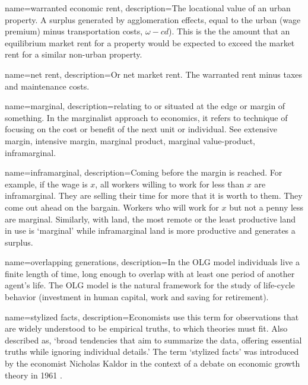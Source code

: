 {
name=warranted economic rent,
description={The locational value of an urban property. A surplus generated by \glspl{agglomeration effect}, equal to the urban (wage premium) minus transportation costs, $\omega-{c} d$). This is the the amount that an equilibrium market rent for a property would be expected to exceed the market rent for a similar non-urban property.}
}

{
name=net rent,
description={Or net market rent. The \gls{warranted rent} minus taxes and maintenance costs.}
}



{
name=marginal,
description={relating to or situated at the edge or margin of something. In the marginalist approach to economics, it  refers to technique of focusing on the cost or benefit of the next unit or individual. See \gls{extensive margin}, \gls{intensive margin}, \gls{marginal product}, \gls{marginal value-product}, \gls{inframarginal}.}
}

{
name=inframarginal,
description={Coming before the margin is reached. For example, if the wage is $x$, all workers willing to work for less than $x$ are inframarginal. They are selling their time for more that it is worth to them. They come out ahead on the bargain. Workers who will work for $x$ but not a penny less are marginal. Similarly, with land, the most remote or the least productive land in use is `marginal' while  inframarginal land is more productive and generates a \gls{surplus}.}
}

{
name=overlapping generations,
description={In the \gls{OLG} model individuals live a finite length of time, long enough to overlap with at least one period of another agent's life. The OLG model is the natural framework for the study of life-cycle behavior (investment in human capital, work and saving for retirement).}
}

{
name=stylized facts,
description={Economists use this term for observations that are widely understood to be empirical truths, to which theories must fit.  Also described as, `broad tendencies that aim to summarize the data, offering essential truths while ignoring individual details.' The term `stylized facts' was introduced by the economist Nicholas Kaldor in the context of a debate on economic growth theory in 1961 \cite{kaldorCapitalAccumulationEconomic1961}.}
}

